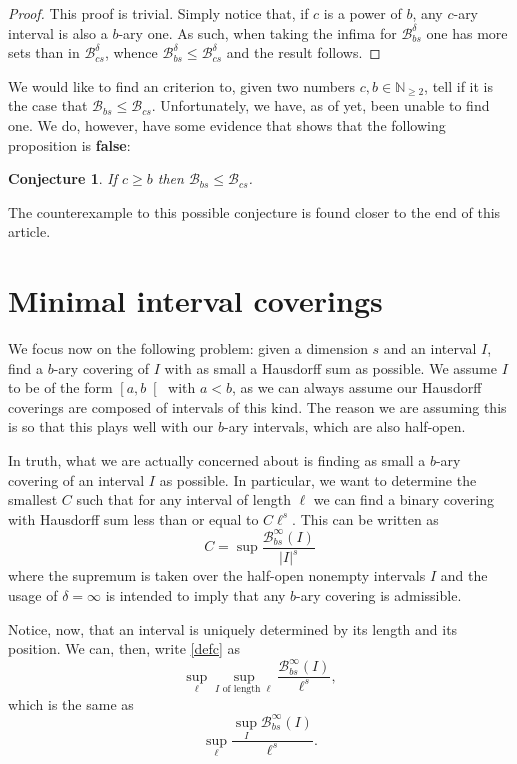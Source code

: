 \documentclass[11pt, reqno]{amsart}
\newcommand{\N}{\mathbb{N}}
\newcommand{\BB}{\mathcal{B}}
\newtheorem{conjecture}{Conjecture}
\begin{document}
\begin{proof}
This proof is trivial. Simply notice that, if $c$ is a power of $b$, any $c$-ary interval is also a $b$-ary one. As such, when taking the infima for $\BB_{bs}^\delta$ one has more sets than in $\BB_{cs}^\delta$, whence $\BB_{bs}^\delta \leq \BB_{cs}^\delta$ and the result follows.
\end{proof}

We would like to find an criterion to, given two numbers $c, b \in \N_{\geq 2}$, tell if it is the case that $\BB_{bs} \leq \BB_{cs}$. Unfortunately, we have, as of yet, been unable to find one. We do, however, have some evidence that shows that the following proposition is \textbf{false}: 

\begin{conjecture}
If $c \geq b$ then $\BB_{bs} \leq \BB_{cs}$.
\end{conjecture}

The counterexample to this possible conjecture is found closer to the end of this article.

\section{Minimal interval coverings}\label{sec5}

We focus now on the following problem: given a dimension $s$ and an interval $I$, find a $b$-ary covering of $I$ with as small a Hausdorff sum as possible. We assume $I$ to be of the form $\left[ a, b \right[$ with $a < b$, as we can always assume our Hausdorff coverings are composed of intervals of this kind. The reason we are assuming this is so that this plays well with our $b$-ary intervals, which are also half-open.

In truth, what we are actually concerned about is finding as small a $b$-ary covering of an interval $I$ as possible. In particular, we want to determine the smallest $C$ such that for any interval of length $\ell$ we can find a binary covering with Hausdorff sum less than or equal to $C \ell^s$. This can be written as
\begin{equation}\label{defc}
C = \sup \frac{\BB_{bs}^\infty(I)}{\lvert I \rvert^s}
\end{equation}
where the supremum is taken over the half-open nonempty intervals $I$ and the usage of $\delta = \infty$ is intended to imply that any $b$-ary covering is admissible.

Notice, now, that an interval is uniquely determined by its length and its position. We can, then, write \eqref{defc} as
\[\sup_\ell \sup_\text{$I$ of length $\ell$} \frac{\BB_{bs}^\infty(I)}{\ell^s},\]
which is the same as
\[\sup_\ell \frac{\sup_I \BB_{bs}^\infty(I)}{\ell^s}.\]
\end{document}
